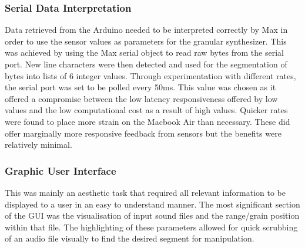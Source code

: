 \documentclass[titlepage]{scrartcl}
\begin{document}
\subsubsection{Serial Data Interpretation}
Data retrieved from the Arduino needed to be interpreted correctly by Max in
order to use the sensor values as parameters for the granular synthesizer. This
was achieved by using the Max serial object to read raw bytes from the serial
port. New line characters were then detected and used for the segmentation of
bytes into lists of 6 integer values. Through experimentation with different
rates, the serial port was set to be polled every 50ms. This value was chosen
as it offered a compromise between the low latency responsiveness offered by
low values and the low computational cost as a result of high values. Quicker
rates were found to place more strain on the Macbook Air than necessary. These
did offer marginally more responsive feedback from sensors but the benefits
were relatively minimal.

\subsubsection{Graphic User Interface}
This was mainly an aesthetic task that required all relevant information to be
displayed to a user in an easy to understand manner. The most significant
section of the GUI was the visualisation of input sound files and the
range/grain position within that file. The highlighting of these parameters
allowed for quick scrubbing of an audio file visually to find the desired
segment for manipulation.
\end{document}
